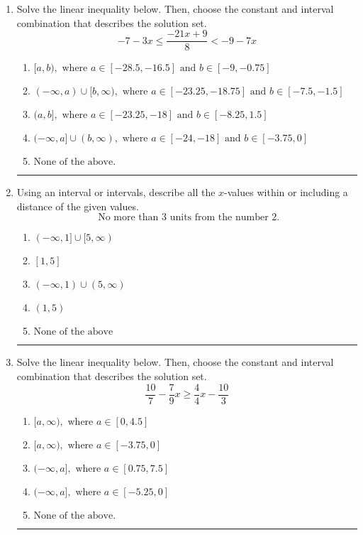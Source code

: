 \documentclass[14pt]{extbook}
\newcommand{\litem}[1]{\item#1\hspace*{-1cm}\rule{\textwidth}{0.4pt}}
\begin{document}
\begin{enumerate}
{\begin{enumerate}[label=\Alph*.]
\end{enumerate} }
\litem{
Solve the linear inequality below. Then, choose the constant and interval combination that describes the solution set.\[ -7 - 3 x \leq \frac{-21 x + 9}{8} < -9 - 7 x \]\begin{enumerate}[label=\Alph*.]
\item \( [a, b), \text{ where } a \in [-28.5, -16.5] \text{ and } b \in [-9, -0.75] \)
\item \( (-\infty, a) \cup [b, \infty), \text{ where } a \in [-23.25, -18.75] \text{ and } b \in [-7.5, -1.5] \)
\item \( (a, b], \text{ where } a \in [-23.25, -18] \text{ and } b \in [-8.25, 1.5] \)
\item \( (-\infty, a] \cup (b, \infty), \text{ where } a \in [-24, -18] \text{ and } b \in [-3.75, 0] \)
\item \( \text{None of the above.} \)

\end{enumerate} }
\litem{
Using an interval or intervals, describe all the $x$-values within or including a distance of the given values.\[ \text{ No more than } 3 \text{ units from the number } 2. \]\begin{enumerate}[label=\Alph*.]
\item \( (-\infty, 1] \cup [5, \infty) \)
\item \( [1, 5] \)
\item \( (-\infty, 1) \cup (5, \infty) \)
\item \( (1, 5) \)
\item \( \text{None of the above} \)

\end{enumerate} }
\litem{
Solve the linear inequality below. Then, choose the constant and interval combination that describes the solution set.\[ \frac{10}{7} - \frac{7}{9} x \geq \frac{4}{4} x - \frac{10}{3} \]\begin{enumerate}[label=\Alph*.]
\item \( [a, \infty), \text{ where } a \in [0, 4.5] \)
\item \( [a, \infty), \text{ where } a \in [-3.75, 0] \)
\item \( (-\infty, a], \text{ where } a \in [0.75, 7.5] \)
\item \( (-\infty, a], \text{ where } a \in [-5.25, 0] \)
\item \( \text{None of the above}. \)


\end{enumerate}}
\end{enumerate}
\end{document}
